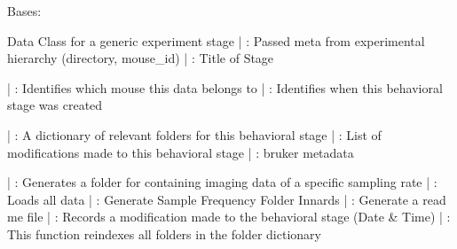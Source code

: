 \documentclass[letterpaper,10pt,english]{sphinxmanual}
\begin{document}
\begin{fulllineitems}
\begin{fulllineitems}
\begin{quote}
\begin{description}
\end{description}\end{quote}

\end{fulllineitems}


\end{fulllineitems}


\begin{fulllineitems}
\label{\detokenize{ExperimentHierarchy:ExperimentHierarchy.ExperimentStage}}
\pysigstartsignatures
{}
\pysigstopsignatures
\sphinxAtStartPar
Bases: 

\sphinxAtStartPar
Data Class for a generic experiment stage
|  : Passed meta from experimental hierarchy (directory, mouse\_id)
|  : Title of Stage

\sphinxAtStartPar
{}
|  : Identifies which mouse this data belongs to
|  : Identifies when this behavioral stage was created

\sphinxAtStartPar
{}
|  : A dictionary of relevant folders for this behavioral stage
|  : List of modifications made to this behavioral stage
|  : bruker metadata

\sphinxAtStartPar
{}
|  : Generates a folder for containing imaging data of a specific sampling rate
|  : Loads all data
|  : Generate Sample Frequency Folder Innards
|  : Generate a read me file
|  :  Records a modification made to the behavioral stage (Date \& Time)
|  : This function reindexes all folders in the folder dictionary


\end{fulllineitems}
\end{document}

